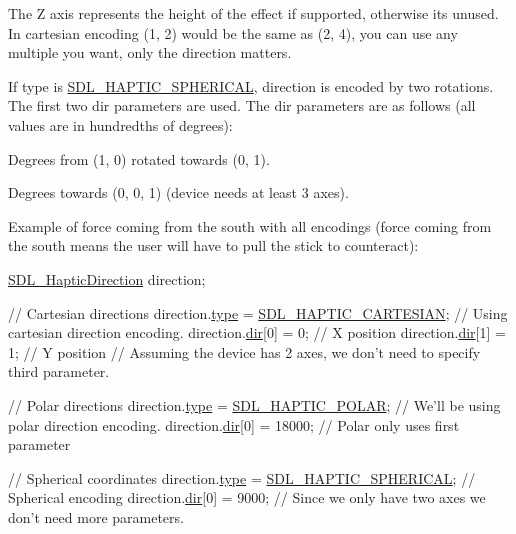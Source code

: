 The Z axis represents the height of the effect if supported, otherwise it\textquotesingle{}s unused. In cartesian encoding (1, 2) would be the same as (2, 4), you can use any multiple you want, only the direction matters.

If type is \mbox{\hyperlink{_s_d_l__haptic_8h_a1fcf7cb0eaf3c39b16ba266054e25aff}{S\+D\+L\+\_\+\+H\+A\+P\+T\+I\+C\+\_\+\+S\+P\+H\+E\+R\+I\+C\+AL}}, direction is encoded by two rotations. The first two {\ttfamily dir} parameters are used. The {\ttfamily dir} parameters are as follows (all values are in hundredths of degrees)\+:
\begin{DoxyItemize}
\item Degrees from (1, 0) rotated towards (0, 1).
\item Degrees towards (0, 0, 1) (device needs at least 3 axes).
\end{DoxyItemize}

Example of force coming from the south with all encodings (force coming from the south means the user will have to pull the stick to counteract)\+: 
\begin{DoxyCode}
\mbox{\hyperlink{struct_s_d_l___haptic_direction}{SDL\_HapticDirection}} direction;

\textcolor{comment}{// Cartesian directions}
direction.\mbox{\hyperlink{struct_s_d_l___haptic_direction_acd6830ad68c4ba2af16057fa418087cc}{type}} = \mbox{\hyperlink{_s_d_l__haptic_8h_af8b2430a363a968de2a5b64c8f663d3b}{SDL\_HAPTIC\_CARTESIAN}}; \textcolor{comment}{// Using cartesian direction encoding.}
direction.\mbox{\hyperlink{struct_s_d_l___haptic_direction_a6cebd8118a3e61e36bd0c503ae020362}{dir}}[0] = 0; \textcolor{comment}{// X position}
direction.\mbox{\hyperlink{struct_s_d_l___haptic_direction_a6cebd8118a3e61e36bd0c503ae020362}{dir}}[1] = 1; \textcolor{comment}{// Y position}
\textcolor{comment}{// Assuming the device has 2 axes, we don't need to specify third parameter.}

\textcolor{comment}{// Polar directions}
direction.\mbox{\hyperlink{struct_s_d_l___haptic_direction_acd6830ad68c4ba2af16057fa418087cc}{type}} = \mbox{\hyperlink{_s_d_l__haptic_8h_acdc35e97e5525472054a67b76e518f3b}{SDL\_HAPTIC\_POLAR}}; \textcolor{comment}{// We'll be using polar direction encoding.}
direction.\mbox{\hyperlink{struct_s_d_l___haptic_direction_a6cebd8118a3e61e36bd0c503ae020362}{dir}}[0] = 18000; \textcolor{comment}{// Polar only uses first parameter}

\textcolor{comment}{// Spherical coordinates}
direction.\mbox{\hyperlink{struct_s_d_l___haptic_direction_acd6830ad68c4ba2af16057fa418087cc}{type}} = \mbox{\hyperlink{_s_d_l__haptic_8h_a1fcf7cb0eaf3c39b16ba266054e25aff}{SDL\_HAPTIC\_SPHERICAL}}; \textcolor{comment}{// Spherical encoding}
direction.\mbox{\hyperlink{struct_s_d_l___haptic_direction_a6cebd8118a3e61e36bd0c503ae020362}{dir}}[0] = 9000; \textcolor{comment}{// Since we only have two axes we don't need more parameters.}
\end{DoxyCode}


